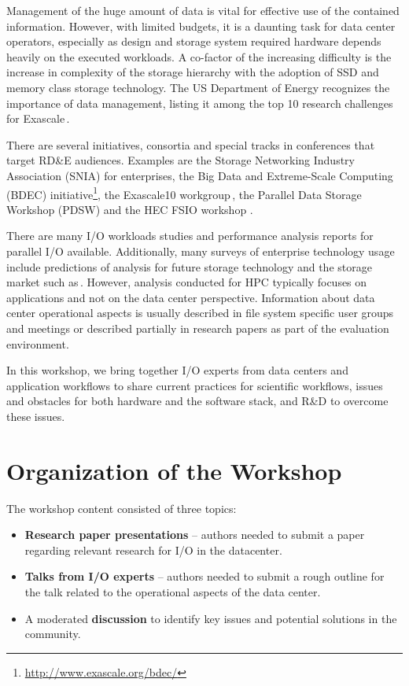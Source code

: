 \documentclass{llncs}
\begin{document}
Management of the huge amount of data is vital for effective use of the contained information. However, with limited budgets, it is a daunting task for data center operators,
especially as design and storage system required hardware depends heavily on the executed workloads.
A co-factor of the increasing difficulty is the increase in complexity of the storage hierarchy with the adoption of SSD and memory class storage technology.
The US Department of Energy recognizes the importance of data management, listing it among the top 10 research challenges for Exascale\,\cite{top14}. %

There are several initiatives, consortia and special tracks in conferences that target RD\&E audiences.
Examples are the Storage Networking Industry Association (SNIA) for enterprises, the
Big Data and Extreme-Scale Computing (BDEC) initiative\footnote{\url{http://www.exascale.org/bdec/}}, the
Exascale10 workgroup\,\cite{brinkmann14}, the Parallel Data Storage Workshop (PDSW) and the HEC FSIO workshop \cite{bancroft2009}.

There are many I/O workloads studies and performance analysis reports for parallel I/O available.
Additionally, many surveys of enterprise technology usage include predictions of analysis for future storage technology and the storage market such as\,\cite{idc1}.
However, analysis conducted for HPC typically focuses on applications and not on the data center perspective.
Information about data center operational aspects is usually described in file system specific user groups and meetings or described partially in research papers as part of the evaluation environment.

In this workshop, we bring together I/O experts from data centers and application workflows to share current practices for scientific workflows, issues and obstacles for both hardware and the software stack, and R\&D to overcome these issues.


\section{Organization of the Workshop}

\noindent The workshop content consisted of three topics:
\begin{itemize}
  \item \textbf{Research paper presentations} -- authors needed to submit a paper regarding relevant research for I/O in the datacenter.
  \item \textbf{Talks from I/O experts} -- authors needed to submit a rough outline for the talk related to the operational aspects of the data center.
  \item A moderated \textbf{discussion} to identify key issues and potential solutions in the community.
\end{itemize}
\end{document}
